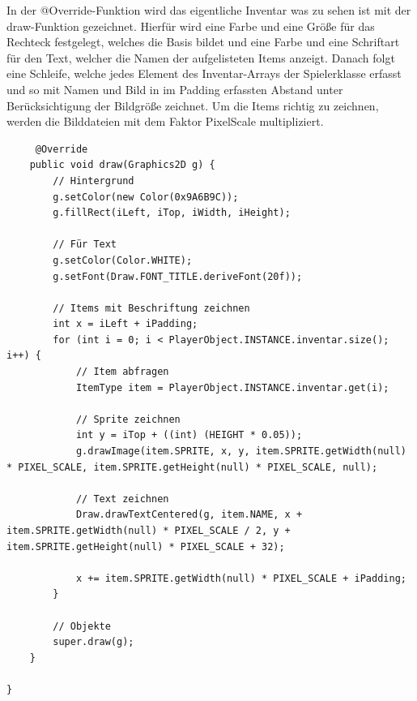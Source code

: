 In der @Override-Funktion wird das eigentliche Inventar was zu sehen ist mit der draw-Funktion gezeichnet. Hierfür wird eine Farbe und eine Größe für das Rechteck festgelegt, welches die Basis bildet und eine Farbe und eine Schriftart für den Text, welcher die Namen der aufgelisteten Items anzeigt. Danach folgt eine Schleife, welche jedes Element des Inventar-Arrays der Spielerklasse erfasst und so mit Namen und Bild in im Padding erfassten Abstand unter Berücksichtigung der Bildgröße zeichnet. Um die Items richtig zu zeichnen, werden die Bilddateien mit dem Faktor PixelScale multipliziert.
\\
\begin{lstlisting}
     @Override
    public void draw(Graphics2D g) {
        // Hintergrund
        g.setColor(new Color(0x9A6B9C));
        g.fillRect(iLeft, iTop, iWidth, iHeight);

        // Für Text
        g.setColor(Color.WHITE);
        g.setFont(Draw.FONT_TITLE.deriveFont(20f));

        // Items mit Beschriftung zeichnen
        int x = iLeft + iPadding;
        for (int i = 0; i < PlayerObject.INSTANCE.inventar.size(); i++) {
            // Item abfragen
            ItemType item = PlayerObject.INSTANCE.inventar.get(i);

            // Sprite zeichnen
            int y = iTop + ((int) (HEIGHT * 0.05));
            g.drawImage(item.SPRITE, x, y, item.SPRITE.getWidth(null) * PIXEL_SCALE, item.SPRITE.getHeight(null) * PIXEL_SCALE, null);

            // Text zeichnen
            Draw.drawTextCentered(g, item.NAME, x + item.SPRITE.getWidth(null) * PIXEL_SCALE / 2, y + item.SPRITE.getHeight(null) * PIXEL_SCALE + 32);

            x += item.SPRITE.getWidth(null) * PIXEL_SCALE + iPadding;
        }

        // Objekte
        super.draw(g);
    }
    
}
\end{lstlisting}


